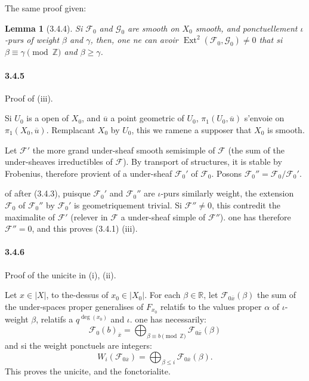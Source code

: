\documentclass[12pt,a4paper]{article}
\theoremstyle{plain}
\newtheorem{lemma}[theorem]{Lemma}
\theoremstyle{definition}
\theoremstyle{remark}
\DeclareMathOperator{\Ext}{Ext}
\newcommand{\RR}{{\mathbb{R}}}
\newcommand{\ZZ}{{\mathbb{Z}}}
\begin{document}
The same proof given:

\begin{lemma}[3.4.4]
Si $\mathscr{F}_0$ and $\mathscr{G}_0$ are smooth on $X_0$ smooth, and ponctuellement $\iota$-purs of weight $\beta$ and $\gamma$, then, one ne can avoir $\Ext^2(\mathscr{F}_0, \mathscr{G}_0) \neq 0$ that si $\beta \equiv \gamma \pmod{\ZZ}$ and $\beta \geq \gamma$.
\end{lemma}

\paragraph{3.4.5}
Proof of (iii).


Si $U_0$ is a open of $X_0$, and $\overline{u}$ a point geometric of $U_0$, $\pi_1(U_0, \overline{u})$ s'envoie on $\pi_1(X_0, \overline{u})$. Remplacant $X_0$ by $U_0$, this we ramene a supposer that $X_0$ is smooth.

Let $\mathscr{F}'$ the more grand under-sheaf smooth semisimple of $\mathscr{F}$ (the sum of the under-sheaves irreductibles of $\mathscr{F}$). By transport of structures, it is stable by Frobenius, therefore provient of a under-sheaf $\mathscr{F}_0'$ of $\mathscr{F}_0$. Posons $\mathscr{F}_0'' = \mathscr{F}_0 / \mathscr{F}_0'$.

of after (3.4.3), puisque $\mathscr{F}_0'$ and $\mathscr{F}_0''$ are $\iota$-purs similarly weight, the extension $\mathscr{F}_0$ of $\mathscr{F}_0''$ by $\mathscr{F}_0'$ is geometriquement trivial. Si $\mathscr{F}'' \neq 0$, this contredit the maximalite of $\mathscr{F}'$ (relever in $\mathscr{F}$ a under-sheaf simple of $\mathscr{F}''$). one has therefore $\mathscr{F}'' = 0$, and this proves (3.4.1) (iii).

\paragraph{3.4.6}
Proof of the unicite in (i), (ii).


Let $x \in |X|$, to the-dessus of $x_0 \in |X_0|$. For each $\beta \in \RR$, let $\mathscr{F}_{0\overline{x}}(\beta)$ the sum of the under-spaces proper generalises of $F_{x_0}$ relatifs to the values proper $\alpha$ of $\iota$-weight $\beta$, relatifs a $q^{\deg(x_0)}$ and $\iota$. one has necessarily:
\[ \mathscr{F}_0(b)_{\overline{x}} = \bigoplus_{\beta \equiv b \pmod{\ZZ}} \mathscr{F}_{0\overline{x}}(\beta) \]
and si the weight ponctuels are integers:
\[ W_i(\mathscr{F}_{0\overline{x}}) = \bigoplus_{\beta \leq i} \mathscr{F}_{0\overline{x}}(\beta). \]
This proves the unicite, and the fonctorialite.
\end{document}
